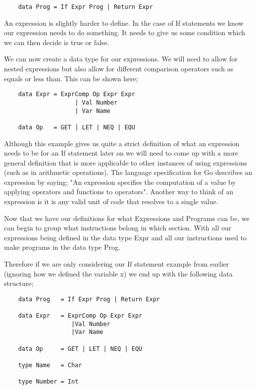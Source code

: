 
\begin{lstlisting}
	data Prog = If Expr Prog | Return Expr
\end{lstlisting}


An expression is slightly harder to define. In the case of If statements we know our expression needs to do something. It needs to give us some condition which we can then decide is true or false. 

We can now create a data type for our expressions. We will need to allow for nested expressions but also allow for different comparison operators such as equals or less than. This can be shown here;

\begin{lstlisting}
	data Expr = ExprComp Op Expr Expr 
                  	| Val Number 
                 	| Var Name
 
	data Op	  = GET | LET | NEQ | EQU
\end{lstlisting}

Although this example gives us quite a strict definition of what an expression needs to be for an If statement later on we will need to come up with a more general definition that is more applicable to other instances of using expressions (such as in arithmetic operations). The language specification for Go describes an expression by saying; "An expression specifies the computation of a value by applying operators and functions to operators". Another way to think of an expression is it is any valid unit of code that resolves to a single value.


Now that we have our definitions for what Expressions and Programs can be, we can begin to group what instructions belong in which section. With all our expressions being defined in the data type Expr and all our instructions used to make programs in the data type Prog.

Therefore if we are only considering our If statement example from earlier (ignoring how we defined the variable  x) we end up with the following data structure;

\newpage

\begin{lstlisting}
	data Prog   = If Expr Prog | Return Expr

	data Expr   = ExprComp Op Expr Expr 
	               |Val Number 
	               |Var Name 

	data Op     = GET | LET | NEQ | EQU

	type Name   = Char

	type Number = Int
\end{lstlisting}

